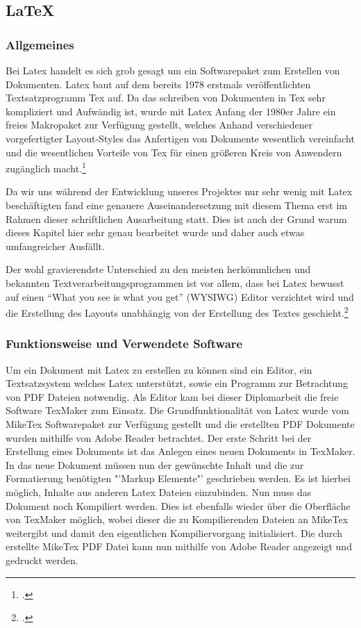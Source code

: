  \subsection{LaTeX} 

\subsubsection{Allgemeines}
Bei Latex handelt es sich grob gesagt um ein Softwarepaket zum Erstellen von Dokumenten. Latex baut auf dem bereits 1978 erstmals veröffentlichten Textsatzprogramm Tex auf. Da das schreiben von Dokumenten in Tex sehr kompliziert und Aufwändig ist, wurde mit Latex Anfang der 1980er Jahre ein freies Makropaket zur Verfügung gestellt, welches Anhand verschiedener vorgefertigter Layout-Styles das Anfertigen von Dokumente wesentlich vereinfacht und die wesentlichen Vorteile von Tex für einen größeren Kreis von Anwendern zugänglich macht.\footcite[vgl.][]{latex}

Da wir uns während der Entwicklung unseres Projektes nur sehr wenig mit Latex beschäftigten fand eine genauere Auseinandersetzung mit diesem Thema erst im Rahmen dieser schriftlichen Ausarbeitung statt. Dies ist auch der Grund warum dieses Kapitel hier sehr genau bearbeitet wurde und daher auch etwas umfangreicher Ausfällt.

Der wohl gravierendste Unterschied zu den meisten herkömmlichen und bekannten Textverarbeitungsprogrammen ist vor allem, dass bei Latex bewusst auf einen “What you see is what you get” (WYSIWG) Editor verzichtet wird und die Erstellung des Layouts unabhängig von der Erstellung des Textes geschieht.\footcite[vgl.][]{latexpfort}
\subsubsection{Funktionsweise und Verwendete Software}
Um ein Dokument mit Latex zu erstellen zu können sind ein Editor, ein Textsatzsystem welches Latex unterstützt, sowie ein Programm zur Betrachtung von PDF Dateien notwendig. Als Editor kam bei dieser Diplomarbeit die freie Software TexMaker zum Einsatz. Die Grundfunktionalität von Latex wurde vom MikeTex Softwarepaket zur Verfügung gestellt und die erstellten PDF Dokumente wurden mithilfe von Adobe Reader betrachtet.
Der erste Schritt bei der Erstellung eines Dokuments ist das Anlegen eines neuen Dokuments in TexMaker. In das neue Dokument müssen nun der gewünschte Inhalt und die zur Formatierung benötigten "'Markup Elemente"' geschrieben werden. Es ist hierbei möglich, Inhalte aus anderen Latex Dateien einzubinden.
Nun muss das Dokument noch Kompiliert werden. Dies ist ebenfalls wieder über die Oberfläche von TexMaker möglich, wobei dieser die zu Kompilierenden Dateien an MikeTex weitergibt und damit den eigentlichen Kompiliervorgang initialisiert.
Die durch erstellte MikeTex PDF Datei kann nun mithilfe von Adobe Reader angezeigt und gedruckt werden.
